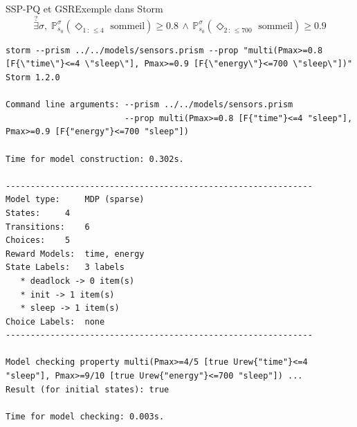 \documentclass[compress]{beamer}
\theoremstyle{theorem}%
\begin{document}
\begin{frame}[fragile]{SSP-PQ et GSR}{Exemple dans Storm}
    \vspace{-0.05\linewidth}
    \[
    \overset{?}{\exists} \sigma, \; \mathbb{P}^{\sigma}_{s_0}(\Diamond_{1\, :\, \leq 4} \text{ sommeil}) \geq 0.8 \, \wedge \,
              \mathbb{P}^{\sigma}_{s_0}(\Diamond_{2\, :\, \leq 700} \text{ sommeil}) \geq 0.9
    \]
  {\fontsize{4}{5}
  \begin{verbatim}
storm --prism ../../models/sensors.prism --prop "multi(Pmax>=0.8 [F{\"time\"}<=4 \"sleep\"], Pmax>=0.9 [F{\"energy\"}<=700 \"sleep\"])"
Storm 1.2.0

Command line arguments: --prism ../../models/sensors.prism
                        --prop multi(Pmax>=0.8 [F{"time"}<=4 "sleep"], Pmax>=0.9 [F{"energy"}<=700 "sleep"])

Time for model construction: 0.302s.

--------------------------------------------------------------
Model type: 	MDP (sparse)
States: 	4
Transitions: 	6
Choices: 	5
Reward Models:  time, energy
State Labels: 	3 labels
   * deadlock -> 0 item(s)
   * init -> 1 item(s)
   * sleep -> 1 item(s)
Choice Labels: 	none
--------------------------------------------------------------

Model checking property multi(Pmax>=4/5 [true Urew{"time"}<=4 "sleep"], Pmax>=9/10 [true Urew{"energy"}<=700 "sleep"]) ...
Result (for initial states): true

Time for model checking: 0.003s.
  \end{verbatim}
  }
\end{frame}
\end{document}
